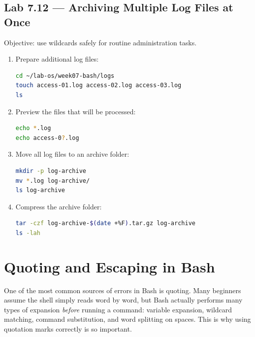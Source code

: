 \subsection*{Lab 7.12 --- Archiving Multiple Log Files at Once}

Objective: use wildcards safely for routine administration tasks.

\begin{enumerate}
  \item Prepare additional log files:
\begin{lstlisting}[language=bash, caption={Preparing additional log files}]
cd ~/lab-os/week07-bash/logs
touch access-01.log access-02.log access-03.log
ls
\end{lstlisting}

  \item Preview the files that will be processed:
\begin{lstlisting}[language=bash, caption={Previewing the wildcard result}]
echo *.log
echo access-0?.log
\end{lstlisting}

  \item Move all log files to an archive folder:
\begin{lstlisting}[language=bash, caption={Moving log files to the archive folder}]
mkdir -p log-archive
mv *.log log-archive/
ls log-archive
\end{lstlisting}

  \item Compress the archive folder:
\begin{lstlisting}[language=bash, caption={Creating a compressed archive}]
tar -czf log-archive-$(date +%F).tar.gz log-archive
ls -lah
\end{lstlisting}
\end{enumerate}

\section{Quoting and Escaping in Bash}
\label{sec:quoting-escaping}

One of the most common sources of errors in Bash is quoting. Many beginners
assume the shell simply reads word by word, but Bash actually performs many
types of expansion \textit{before} running a command: variable expansion,
wildcard matching, command substitution, and word splitting on spaces. This
is why using quotation marks correctly is so important.

